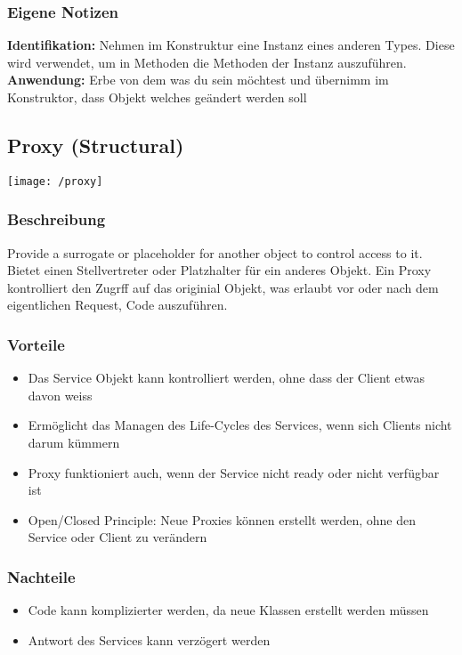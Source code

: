 \subsubsection{Eigene Notizen}
\textbf{Identifikation:} Nehmen im Konstruktur eine Instanz eines anderen Types. Diese wird verwendet, um in Methoden die Methoden der Instanz auszuführen.\\
\textbf{Anwendung:} Erbe von dem was du sein möchtest und übernimm im Konstruktor, dass Objekt welches geändert werden soll


\subsection{Proxy (Structural)}
\texttt{[image: /proxy]}
\subsubsection{Beschreibung}
Provide a surrogate or placeholder for another object to control access to it.\\
Bietet einen Stellvertreter oder Platzhalter für ein anderes Objekt. Ein Proxy kontrolliert den Zugrff auf das originial Objekt, was erlaubt vor oder nach dem eigentlichen Request, Code auszuführen.
\subsubsection{Vorteile}
\begin{itemize}[topsep=0pt]
    \itemsep -0.4em
    \item Das Service Objekt kann kontrolliert werden, ohne dass der Client etwas davon weiss
    \item Ermöglicht das Managen des Life-Cycles des Services, wenn sich Clients nicht darum kümmern
    \item Proxy funktioniert auch, wenn der Service nicht ready oder nicht verfügbar ist
    \item Open/Closed Principle: Neue Proxies können erstellt werden, ohne den Service oder Client zu verändern
\end{itemize}
\subsubsection{Nachteile}
\begin{itemize}[topsep=0pt]
    \itemsep -0.4em
    \item Code kann komplizierter werden, da neue Klassen erstellt werden müssen
    \item Antwort des Services kann verzögert werden
\end{itemize}
